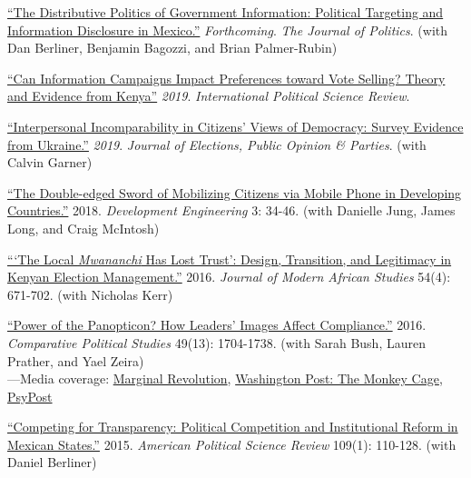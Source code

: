 \documentclass[margin,line]{res}
\begin{document}
{\begin{resume}
\begin{etaremune}
\item  \href{https://doi.org/10.1086/709148}{``The Distributive Politics of Government Information: Political
  Targeting and Information Disclosure in Mexico.''} \emph{Forthcoming}.
  \emph{The Journal of Politics}. (with Dan Berliner, Benjamin Bagozzi,
and Brian Palmer-Rubin)
  
 \item  \href{https://doi.org/10.1177/0192512119836283}{``Can Information Campaigns Impact Preferences toward Vote
   Selling? Theory and Evidence from Kenya''}
   \emph{2019}. \emph{International Political Science Review}.
   
 \item \href{https://doi.org/10.1080/17457289.2018.1554664}{
   ``Interpersonal
     Incomparability in Citizens' Views of Democracy: Survey Evidence
     from Ukraine.''} \emph{2019}. \emph{Journal of Elections,
     Public Opinion \& Parties}. (with Calvin Garner)

 \item  \href{https://doi.org/10.1016/j.deveng.2017.11.001}{``The Double-edged Sword of Mobilizing Citizens via Mobile Phone in
  Developing Countries.''} 2018. \emph{Development
    Engineering}  3: 34-46. (with Danielle Jung, James Long, and Craig McIntosh)

  \item \href{
https://doi.org/10.1017/S0022278X16000604}{```The Local \emph{Mwananchi} Has Lost Trust': Design, Transition,
  and Legitimacy in Kenyan Election Management.''} 2016. \emph{Journal
    of Modern African Studies} 54(4): 671-702. (with Nicholas Kerr)

 \item  \href{https://doi.org/10.1177/0010414016633228}
{``Power of the Panopticon? How Leaders' Images Affect Compliance.''}
  2016.  \emph{Comparative Political Studies} 49(13): 1704-1738. (with
  Sarah Bush, Lauren Prather, and Yael Zeira)\\
  ---Media coverage: \href{https://marginalrevolution.com/marginalrevolution/2016/07/results-free-review.html}{Marginal Revolution},
  \href{https://www.washingtonpost.com/news/monkey-cage/wp/2016/08/25/heres-what-happens-when-scientists-evaluate-research-without-knowing-the-results/?noredirect=on&utm_term=.77408b17a4a9}
  {Washington Post: The Monkey Cage}, \href{https://www.psypost.org/2016/12/scientists-investigate-subliminal-authoritarian-imagery-encourages-citizens-obey-46570}{ PsyPost}

 \item  \href{https://doi.org/10.1177/0010414016633228}{``Competing for Transparency: Political Competition and
  Institutional Reform in Mexican States.''} 2015. \emph{American
  Political Science Review} 109(1): 110-128. (with Daniel Berliner)



\end{etaremune}
\end{resume}}
\end{document}
